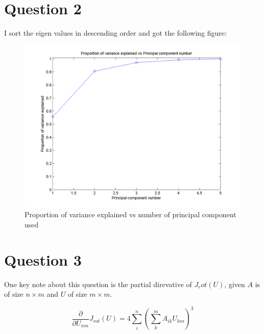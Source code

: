 \documentclass[paper=a4, fontsize=11pt]{scrartcl} %
\numberwithin{equation}{section} %
\numberwithin{figure}{section} %
\numberwithin{table}{section} %
\begin{document}



\section{Question 2}

I sort the eigen values in descending order and got the following figure:

\begin{figure}[H]
  \centering
  \includegraphics[scale=.7]{variance_explained}
  \caption{Proportion of variance explained vs number of principal component used}
\end{figure}

  

\section {Question 3}

One key note about this question is the partial direvative of $J_rot (U)$, given $A$ is of size $n \times m$ and $U$ of size $m \times m$.

\[ \frac {\partial} {\partial U_{nm}} J_{rot } (U) = 4 \sum\limits_i^n (\sum\limits_k^m A_{ik} U_{km})^3\]
\end{document}
